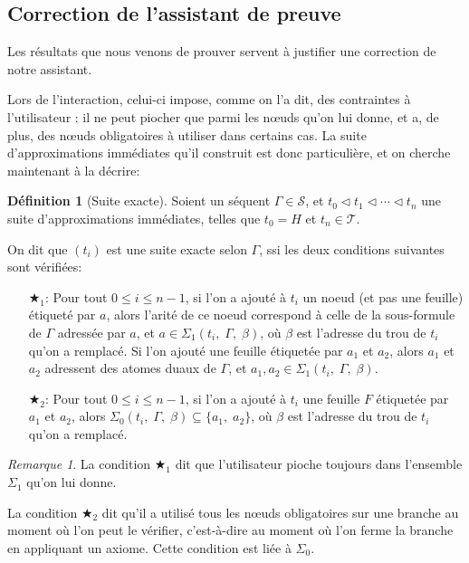 \documentclass[11pt,a4paper]{article}
\theoremstyle{plain}
\theoremstyle{definition}
\newtheorem{definition}{Définition}
\theoremstyle{remark}
\newtheorem{remark}{Remarque}
\newcommand*{\sequent}{\Gamma}
\newcommand*{\sequents}{\ensuremath{\mathcal{S}}}
\newcommand*{\trees}{\ensuremath{\mathcal{T}}}
\newcommand*{\relapprox}{\ensuremath{\triangleleft}}
\newcommand*{\unknown}{H}
\newcommand*{\lowapprox}{\ensuremath{\Sigma_0}}
\newcommand*{\highapprox}{\ensuremath{\Sigma_1}}
\newcommand*{\exactcond}{\bigstar_1}
\newcommand*{\exactcondbis}{\bigstar_2}
\begin{document}
\subsection{Correction de l'assistant de preuve}
\label{correction_section}

Les résultats que nous venons de prouver servent à justifier une correction de notre assistant.

Lors de l'interaction, celui-ci impose, comme on l'a dit, des contraintes à l'utilisateur : il ne peut piocher que parmi les n\oe uds qu'on lui donne, et a, de plus, des n\oe uds obligatoires à utiliser dans certains cas. La suite d'approximations immédiates qu'il construit est donc particulière, et on cherche maintenant à la décrire:


\begin{definition}[Suite exacte]
    Soient un séquent $\sequent \in \sequents$, et $t_0 \relapprox t_1 \relapprox \cdots \relapprox t_n$ une suite d'approximations immédiates, telles que $t_0 = \unknown$ et $t_n \in \trees$.

    On dit que $(t_i)$ est une suite exacte selon $\sequent$, ssi les deux conditions suivantes sont vérifiées:
    \begin{enumerate}
        \item[$\exactcond$:]
        Pour tout $0 \leq i \leq n-1$, si l'on a ajouté à $t_i$ un noeud (et pas une feuille) étiqueté par $a$, alors l'arité de ce noeud correspond à celle de la sous-formule de $\sequent$ adressée par $a$, et $a \in \highapprox(t_i, \; \sequent, \; \beta)$, où $\beta$ est l'adresse du trou de $t_i$ qu'on a remplacé. Si l'on ajouté une feuille étiquetée par $a_1$ et $a_2$, alors $a_1$ et $a_2$ adressent des atomes duaux de $\sequent$, et $a_1, a_2 \in \highapprox(t_i, \; \sequent, \; \beta)$.

        \item[$\exactcondbis$:]
        Pour tout $0 \leq i \leq n-1$, si l'on a ajouté à $t_i$ une feuille $F$ étiquetée par $a_1$ et $a_2$, alors $\lowapprox(t_i, \; \sequent, \; \beta) \subseteq \{a_1, \; a_2\}$, où $\beta$ est l'adresse du trou de $t_i$ qu'on a remplacé.
    \end{enumerate}
\end{definition}

\begin{remark}
    La condition $\exactcond$ dit que l'utilisateur pioche toujours dans l'ensemble $\highapprox$ qu'on lui donne.
    
    La condition $\exactcondbis$ dit qu'il a utilisé tous les n\oe uds obligatoires sur une branche au moment où l'on peut le vérifier, c'est-à-dire au moment où l'on ferme la branche en appliquant un axiome. Cette condition est liée à $\lowapprox$.
\end{remark}
\end{document}
